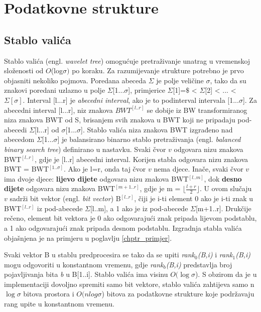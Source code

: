 \documentclass[times, utf8, seminar]{fer}
\begin{document}
\section{Podatkovne strukture}

\subsection{Stablo valića}
\label{stablo_valica_def}
Stablo valića (engl. \textit{wavelet tree}) omogućuje pretraživanje unatrag u vremenskoj složenosti od $O$(log$\sigma)$ po koraku. Za razumijevanje strukture potrebno je prvo objasniti nekoliko pojmova. Poredana abeceda $\Sigma$ je polje veličine $\sigma$, tako da su znakovi poredani uzlazno u polje $\Sigma$[1...$\sigma$], primjerice $\Sigma$[1]=$\$$ < $\Sigma$[2] < ... < $\Sigma[\sigma]$. Interval [l...r] je \textit{abecedni interval}, ako je to podinterval intervala [1...$\sigma$]. Za abecedni interval [l...r], niz znakova $BWT^{[l..r]}$ se dobije iz BW transformiranog niza znakova BWT od S, brisanjem svih znakova u BWT koji ne pripadaju pod-abecedi $\Sigma$[l...r] od $\sigma$[1...$\sigma$].
Stablo valića niza znakova BWT izgrađeno nad abecedom $\Sigma$[1...$\sigma$] je balansirano binarno stablo pretraživanja (engl. \textit{balanced binary search tree}) definirano u nastavku. Svaki čvor $v$ odgovara nizu znakova BWT$^{[l..r]}$, gdje je [l..r] abecedni interval. Korijen stabla odgovara nizu znakova BWT = BWT$^{[1..\sigma]}$. Ako je l=r, onda taj čvor $v$ nema djece. Inače, svaki čvor $v$ ima dvoje djece: \textbf{lijevo dijete} odgovara nizu znakova BWT$^{[l..m]}$, dok \textbf{desno dijete} odgovara nizu znakova BWT$^{[m+1..r]}$, gdje je m = $\lfloor\frac{l+r}{2}\rfloor$. U ovom slučaju $v$ sadrži bit vektor (engl. \textit{bit vector}) B$^{[l..r]}$, čiji je i-ti element 0 ako je i-ti znak u BWT$^{[l..r]}$ iz pod-abecede $\Sigma$[l..m], a 1 ako je iz pod-abecede $\Sigma$[m+1..r]. Drukčije rečeno, element bit vektora je 0 ako odgovarajući znak pripada lijevom podstablu, a 1 ako odgovarajući znak pripada desnom podstablu. Izgradnja stabla valića objašnjena je na primjeru u poglavlju \ref{chptr_primjer}.

Svaki vektor B u stablu predprocesira se tako da se upiti \textit{rank$_{0}$(B,i)} i \textit{rank$_{1}$(B,i)} mogu odgovoriti u konstantnom vremenu, gdje \textit{rank$_{b}$(B,i)} predstavlja broj pojavljivanja bita \textit{b} u B[1..i]. Stablo valića ima visinu $O(\log\sigma$). S obzirom da je u implementaciji dovoljno spremiti samo bit vektore, stablo valića zahtijeva samo n$\log\sigma$ bitova prostora i $O(nlog\sigma$) bitova za podatkovne strukture koje podržavaju rang upite u konstantnom vremenu.
\end{document}

